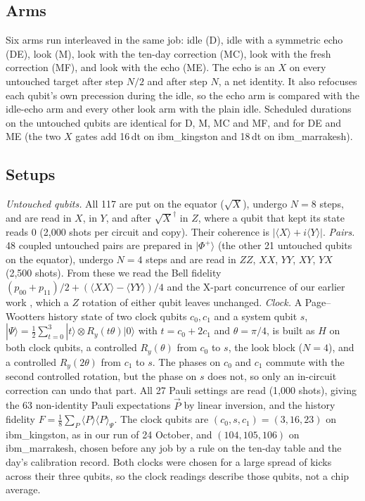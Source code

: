 \documentclass[reprint,amsmath,amssymb,aps,superscriptaddress,nofootinbib]{revtex4-2}
\begin{document}
\subsection{Arms}
Six arms run interleaved in the same job: idle (D), idle with a symmetric echo (DE), look (M), look with the ten-day correction (MC), look with the fresh correction (MF), and look with the echo (ME). The echo is an $X$ on every untouched target after step $N/2$ and after step $N$, a net identity. It also refocuses each qubit's own precession during the idle, so the echo arm is compared with the idle-echo arm and every other look arm with the plain idle. Scheduled durations on the untouched qubits are identical for D, M, MC and MF, and for DE and ME (the two $X$ gates add 16\,dt on ibm\_kingston and 18\,dt on ibm\_marrakesh).

\subsection{Setups}
\emph{Untouched qubits.} All 117 are put on the equator ($\sqrt{X}$), undergo $N=8$ steps, and are read in $X$, in $Y$, and after $\sqrt{X}^\dagger$ in $Z$, where a qubit that kept its state reads 0 (2{,}000 shots per circuit and copy). Their coherence is $|\langle X\rangle+i\langle Y\rangle|$. \emph{Pairs.} 48 coupled untouched pairs are prepared in $|\Phi^+\rangle$ (the other 21 untouched qubits on the equator), undergo $N=4$ steps and are read in $ZZ$, $XX$, $YY$, $XY$, $YX$ (2{,}500 shots). From these we read the Bell fidelity $(p_{00}+p_{11})/2+(\langle XX\rangle-\langle YY\rangle)/4$ and the X-part concurrence of our earlier work \cite{readout}, which a $Z$ rotation of either qubit leaves unchanged. \emph{Clock.} A Page--Wootters history state of two clock qubits $c_0,c_1$ and a system qubit $s$, $|\Psi\rangle=\tfrac12\sum_{t=0}^{3}|t\rangle\otimes R_y(t\theta)|0\rangle$ with $t=c_0+2c_1$ and $\theta=\pi/4$, is built as $H$ on both clock qubits, a controlled $R_y(\theta)$ from $c_0$ to $s$, the look block ($N=4$), and a controlled $R_y(2\theta)$ from $c_1$ to $s$. The phases on $c_0$ and $c_1$ commute with the second controlled rotation, but the phase on $s$ does not, so only an in-circuit correction can undo that part. All 27 Pauli settings are read (1{,}000 shots), giving the 63 non-identity Pauli expectations $\vec{P}$ by linear inversion, and the history fidelity $F=\tfrac18\sum_P\langle P\rangle\langle P\rangle_\Psi$. The clock qubits are $(c_0,s,c_1)=(3,16,23)$ on ibm\_kingston, as in our run of 24 October, and $(104,105,106)$ on ibm\_marrakesh, chosen before any job by a rule on the ten-day table and the day's calibration record. Both clocks were chosen for a large spread of kicks across their three qubits, so the clock readings describe those qubits, not a chip average.
\end{document}
